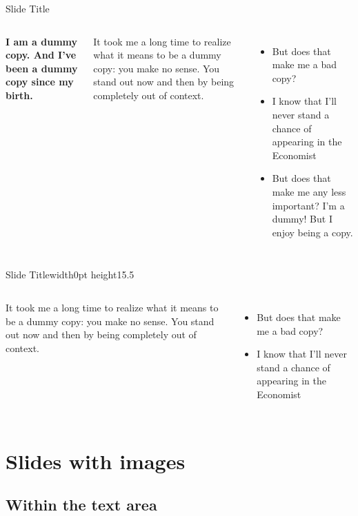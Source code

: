 \documentclass[
 UKenglish%
 ]{beamer}%
\begin{document}
\begin{frame}{Slide Title}
  \begin{columns}[onlytextwidth]
    \column{0.32\hsize}\parskip\medskipamount
    {\color{KITgreen}\bfseries\Large I am a dummy copy. And I’ve been a dummy copy since my birth.\par}

    \bigskip\large
    It took me a long time to realize what it means to be a dummy copy: you make no
    sense. You stand out now and then by being completely out of context.
    
    \begin{itemize}
    \item But does that make me a bad copy?
    \item I know that I’ll never stand a chance of appearing in the Economist
    \item But does that make me any less important? I’m a dummy! But I enjoy being a copy.
    \end{itemize}
    \column{0.33\hsize}
    \column{0.33\hsize}
  \end{columns}
\end{frame}

\begin{frame}[b]{Slide Title\vrule width0pt height15.5\baselineskip}
  \begin{columns}[onlytextwidth]
    \column{0.5\hsize}
    \column{0.5\hsize}\parskip\medskipamount

    \large
    It took me a long time to realize what it means to be a dummy copy: you make no
    sense. You stand out now and then by being completely out of context.

    \bigskip
    \begin{itemize}
    \item But does that make me a bad copy?
    \item I know that I’ll never stand a chance of appearing in the Economist
    \end{itemize}
  \end{columns}
\end{frame}

\section{Slides with images}
\subsection{Within the text area}
\end{document}
